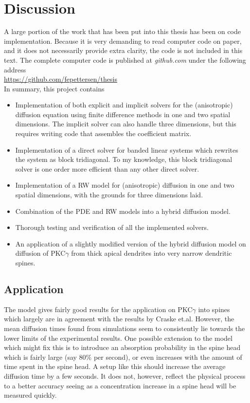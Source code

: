 \section{Discussion}

A large portion of the work that has been put into this thesis has been on code implementation. 
Because it is very demanding to read computer code on paper, and it does not necessarily provide extra clarity, the code is not included in this text. 
The complete computer code is published at \emph{github.com} under the following address \\

\noindent\url{https://github.com/fepettersen/thesis} \\

In summary, this project contains
\begin{itemize}
 \item Implementation of both explicit and implicit solvers for the (anisotropic) diffusion equation using finite difference methods in one and two spatial dimensions. The implicit solver can also handle three dimensions, but this requires writing code that assembles the coefficient matrix.
 \item Implementation of a direct solver for banded linear systems which rewrites the system as block tridiagonal. To my knowledge, this block tridiagonal solver is one order more efficient than any other direct solver.
 \item Implementation of a RW model for (anisotropic) diffusion in one and two spatial dimensions, with the grounds for three dimensions laid.
 \item Combination of the PDE and RW models into a hybrid diffusion model. 
 \item Thorough testing and verification of all the implemented solvers.
 \item An application of a slightly modified version of the hybrid diffusion model on diffusion of PKC$\gamma$ from thick apical dendrites into very narrow dendritic spines.
\end{itemize}

\subsection{Application}

The model gives fairly good results for the application on PKC$\gamma$ into spines which largely are in agreement with the results by Craske et.al. 
However, the mean diffusion times found from simulations seem to consistently lie towards the lower limits of the experimental results. 
One possible extension to the model which might fix this is to introduce an absorption probability in the spine head which is fairly large (say 80\% per second), or even increases with the amount of time spent in the spine head. 
A setup like this should increase the average diffusion time by a few seconds. 
It does not, however, reflect the physical process to a better accuracy seeing as a concentration increase in a spine head will be measured quickly.

